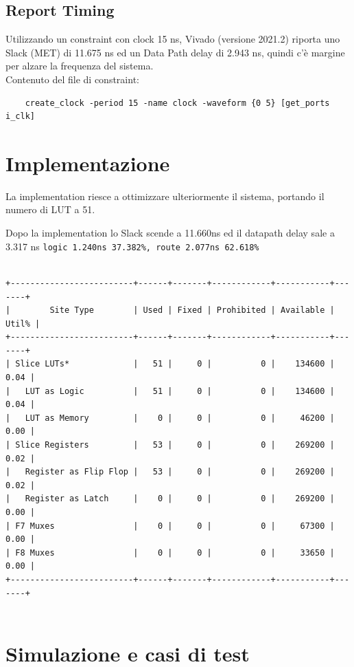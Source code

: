\documentclass[12pt, a4paper]{article}
\begin{document}
\subsection{Report Timing}

Utilizzando un constraint con clock 15 ns, Vivado (versione 2021.2) riporta
uno Slack (MET) di 11.675 ns ed un Data Path delay di 2.943 ns, quindi c'è margine per
alzare la frequenza del sistema.
\\

\noindent Contenuto del file di constraint:
\begin{verbatim}
    create_clock -period 15 -name clock -waveform {0 5} [get_ports i_clk]
\end{verbatim}

\pagebreak

\section{Implementazione}

La implementation riesce a ottimizzare ulteriormente il sistema, portando il numero di LUT a 51.

\noindent Dopo la implementation lo Slack scende a 11.660ns ed il datapath delay sale a 3.317 ns \texttt{logic 1.240ns 37.382\%, route 2.077ns 62.618\%}

\begin{verbatim}

+-------------------------+------+-------+------------+-----------+-------+
|        Site Type        | Used | Fixed | Prohibited | Available | Util% |
+-------------------------+------+-------+------------+-----------+-------+
| Slice LUTs*             |   51 |     0 |          0 |    134600 |  0.04 |
|   LUT as Logic          |   51 |     0 |          0 |    134600 |  0.04 |
|   LUT as Memory         |    0 |     0 |          0 |     46200 |  0.00 |
| Slice Registers         |   53 |     0 |          0 |    269200 |  0.02 |
|   Register as Flip Flop |   53 |     0 |          0 |    269200 |  0.02 |
|   Register as Latch     |    0 |     0 |          0 |    269200 |  0.00 |
| F7 Muxes                |    0 |     0 |          0 |     67300 |  0.00 |
| F8 Muxes                |    0 |     0 |          0 |     33650 |  0.00 |
+-------------------------+------+-------+------------+-----------+-------+
    
    \end{verbatim}

\section{Simulazione e casi di test}
\end{document}
